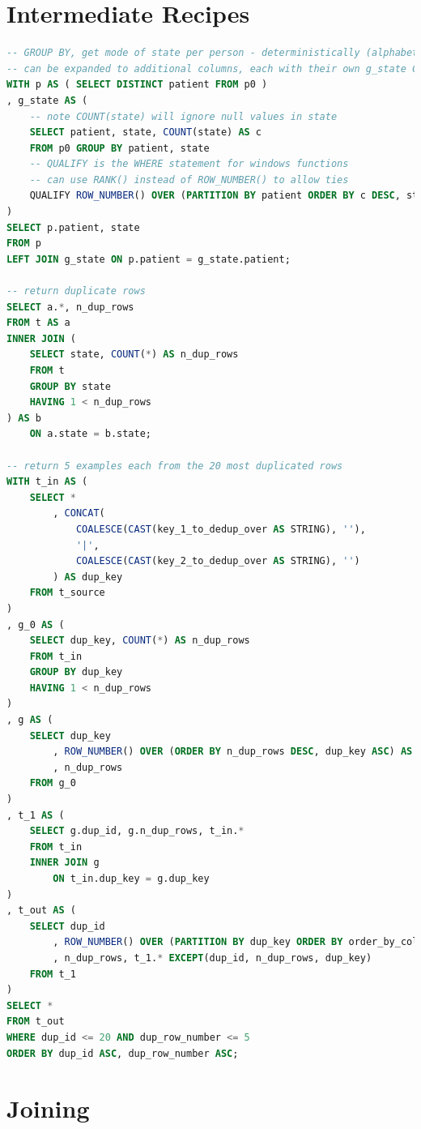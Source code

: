 \section{Intermediate Recipes}
\label{ssql:intermediate_recipes}

\begin{lstlisting}[language=SQL]
-- GROUP BY, get mode of state per person - deterministically (alphabetical order)
-- can be expanded to additional columns, each with their own g_state CTEs
WITH p AS ( SELECT DISTINCT patient FROM p0 )
, g_state AS (
	-- note COUNT(state) will ignore null values in state
	SELECT patient, state, COUNT(state) AS c
	FROM p0 GROUP BY patient, state
	-- QUALIFY is the WHERE statement for windows functions
	-- can use RANK() instead of ROW_NUMBER() to allow ties
	QUALIFY ROW_NUMBER() OVER (PARTITION BY patient ORDER BY c DESC, state ASC) = 1
)
SELECT p.patient, state
FROM p
LEFT JOIN g_state ON p.patient = g_state.patient;

-- return duplicate rows
SELECT a.*, n_dup_rows
FROM t AS a
INNER JOIN (
	SELECT state, COUNT(*) AS n_dup_rows
	FROM t
	GROUP BY state
	HAVING 1 < n_dup_rows
) AS b
	ON a.state = b.state;

-- return 5 examples each from the 20 most duplicated rows
WITH t_in AS (
	SELECT *
		, CONCAT(
			COALESCE(CAST(key_1_to_dedup_over AS STRING), ''),
			'|',
			COALESCE(CAST(key_2_to_dedup_over AS STRING), '')
		) AS dup_key
	FROM t_source
)
, g_0 AS (
	SELECT dup_key, COUNT(*) AS n_dup_rows
	FROM t_in
	GROUP BY dup_key
	HAVING 1 < n_dup_rows
)
, g AS (
	SELECT dup_key
		, ROW_NUMBER() OVER (ORDER BY n_dup_rows DESC, dup_key ASC) AS dup_id
		, n_dup_rows
	FROM g_0
)
, t_1 AS (
	SELECT g.dup_id, g.n_dup_rows, t_in.*
	FROM t_in
	INNER JOIN g
		ON t_in.dup_key = g.dup_key
)
, t_out AS (
	SELECT dup_id
		, ROW_NUMBER() OVER (PARTITION BY dup_key ORDER BY order_by_col ASC) AS dup_row_number
		, n_dup_rows, t_1.* EXCEPT(dup_id, n_dup_rows, dup_key)
	FROM t_1
)
SELECT *
FROM t_out
WHERE dup_id <= 20 AND dup_row_number <= 5
ORDER BY dup_id ASC, dup_row_number ASC;
\end{lstlisting}

\section{Joining}
\label{sql:join}

